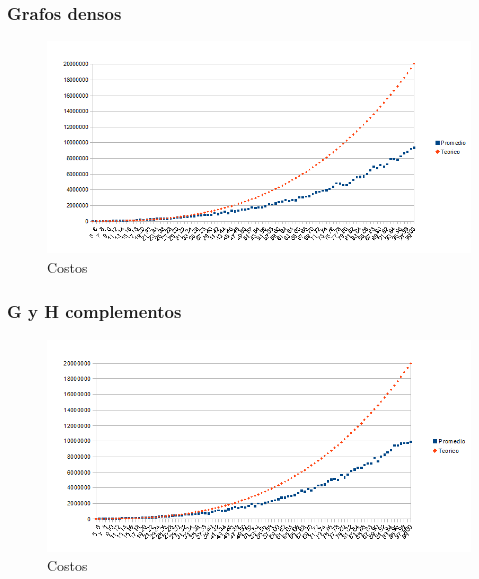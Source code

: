 \subsubsection{Grafos densos}

\begin{figure}[H]
	\centering
	\includegraphics[scale=0.8]{BLocal-tiempos-G-y-H-densos.png}
\caption{Costos}
\end{figure}

\subsubsection{G y H complementos}

\begin{figure}[H]
	\centering
	\includegraphics[scale=0.8]{BLocal-tiempos-H-complemento.png}
\caption{Costos}
\end{figure}

